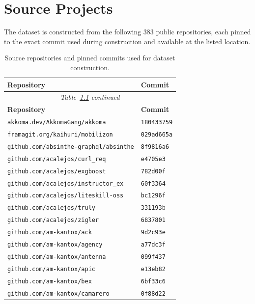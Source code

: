 \chapter{Source Projects}
\label{app:source-projects}
\sloppy

The dataset is constructed from the following \num{383} public repositories, each pinned to the exact commit used during construction and available at the listed location.

\footnotesize
\setlength{\tabcolsep}{4pt}
\begin{longtable}{@{}p{} l@{}}
\caption{Source repositories and pinned commits used for dataset construction.}\label{tab:source-projects}\\
\toprule \textbf{Repository} & \textbf{Commit} \\ \midrule \endfirsthead
\multicolumn{2}{c}{\footnotesize\itshape Table~\ref{tab:source-projects} continued} \\ \toprule \textbf{Repository} & \textbf{Commit} \\ \midrule \endhead
\bottomrule \endfoot
\texttt{akkoma.dev/AkkomaGang/akkoma} & \texttt{180433759} \\
\texttt{framagit.org/kaihuri/mobilizon} & \texttt{029ad665a} \\
\texttt{github.com/absinthe-graphql/absinthe} & \texttt{8f9816a6} \\
\texttt{github.com/acalejos/curl\_req} & \texttt{e4705e3} \\
\texttt{github.com/acalejos/exgboost} & \texttt{782d00f} \\
\texttt{github.com/acalejos/instructor\_ex} & \texttt{60f3364} \\
\texttt{github.com/acalejos/liteskill-oss} & \texttt{bc1296f} \\
\texttt{github.com/acalejos/truly} & \texttt{331193b} \\
\texttt{github.com/acalejos/zigler} & \texttt{6837801} \\
\texttt{github.com/am-kantox/ack} & \texttt{9d2c93e} \\
\texttt{github.com/am-kantox/agency} & \texttt{a77dc3f} \\
\texttt{github.com/am-kantox/antenna} & \texttt{099f437} \\
\texttt{github.com/am-kantox/apic} & \texttt{e13eb82} \\
\texttt{github.com/am-kantox/bex} & \texttt{6bf33c6} \\
\texttt{github.com/am-kantox/camarero} & \texttt{0f88d22} \\

\end{longtable}
